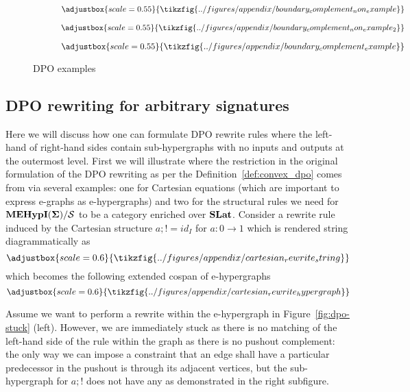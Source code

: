 \begin{figure*}
    \begin{subfigure}{0.48\textwidth}
\[
\adjustbox{scale=0.55}{
    \tikzfig{../figures/appendix/boundary_complement_non_example}
}
\]
    \end{subfigure}
\hfill
    \begin{subfigure}{0.48\textwidth}
        \[
        \adjustbox{scale=0.55}{
            \tikzfig{../figures/appendix/boundary_complement_non_example_2}
        }
        \]
            \end{subfigure}
\begin{subfigure}{\textwidth}
    \[
    \adjustbox{scale=0.55}{
        \tikzfig{../figures/appendix/boundary_complement_example}
    }
    \]
        \end{subfigure}
\caption{DPO examples}
\label{fig:not_boundary_complement}
\end{figure*}


\subsection{DPO rewriting for arbitrary signatures}
\label{sec:dpo-fix}
Here we will discuss how one can formulate DPO rewrite rules where the left-hand of right-hand sides contain sub-hypergraphs with no inputs and outputs at the outermost level.
First we will illustrate where the restriction in the original formulation of the DPO rewriting as per the Definition~\ref{def:convex_dpo} comes from via several examples: one for Cartesian equations (which are important to express e-graphs as e-hypergraphs) and two for the structural rules we need for ${\mathbf{MEHypI(\Sigma)}} / \mathcal{S}$ to be a category enriched over $\mathbf{SLat}$.
Consider a rewrite rule induced by the Cartesian structure $a;! = id_{I}$ for $a : 0 \to 1$ which is rendered string diagrammatically as 
\[
\adjustbox{scale=0.6}{
\tikzfig{../figures/appendix/cartesian_rewrite_string}
}
\]
which becomes the following extended cospan of e-hypergraphs
\[
\adjustbox{scale=0.6}{
\tikzfig{../figures/appendix/cartesian_rewrite_hypergraph}
}
\]

Assume we want to perform a rewrite within the e-hypergraph in Figure~\ref{fig:dpo-stuck} (left).
However, we are immediately stuck as there is no matching of the left-hand side of the rule within the graph as there is no pushout complement: the only way we can impose a constraint that an edge shall have a particular predecessor in the pushout is through its adjacent vertices, but the sub-hypergraph for $a;!$ does not have any as demonstrated in the right subfigure.

